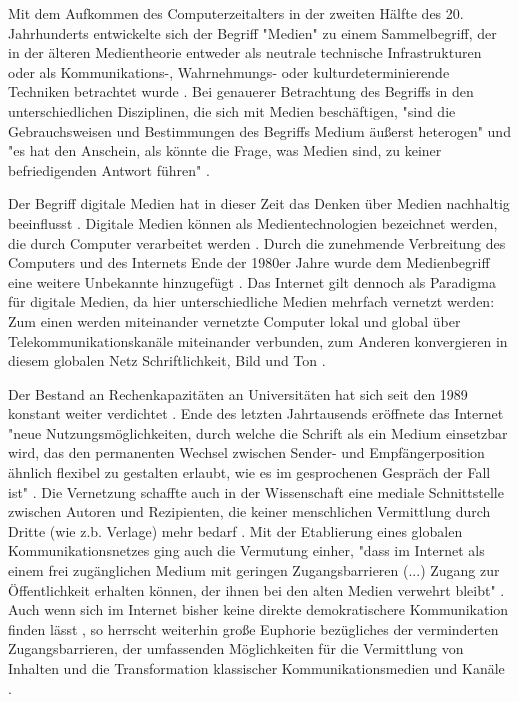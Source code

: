 Mit dem Aufkommen des Computerzeitalters in der zweiten Hälfte des 20. Jahrhunderts entwickelte sich der Begriff "Medien" zu einem Sammelbegriff, der in der älteren Medientheorie entweder als neutrale technische Infrastrukturen oder als Kommunikations-, Wahrnehmungs- oder kulturdeterminierende Techniken betrachtet wurde \cite{beck2005_Kommunikation}. Bei genauerer Betrachtung des Begriffs in den unterschiedlichen Disziplinen, die sich mit Medien beschäftigen, "sind die Gebrauchsweisen und Bestimmungen des Begriffs Medium äußerst heterogen" und "es hat den Anschein, als könnte die Frage, was Medien sind, zu keiner befriedigenden Antwort führen" \cite{Burkhardt_2015}.

Der Begriff digitale Medien hat in dieser Zeit das Denken über Medien nachhaltig beeinflusst  \cite{Burkhardt_2015}. Digitale Medien können als Medientechnologien bezeichnet werden, die durch Computer verarbeitet werden \cite{nunning_2013_metzler}. Durch die zunehmende Verbreitung des Computers und des Internets Ende der 1980er Jahre wurde dem Medienbegriff eine weitere Unbekannte hinzugefügt \cite{Burkhardt_2015}. Das Internet gilt dennoch als Paradigma für digitale Medien, da hier unterschiedliche Medien mehrfach vernetzt werden: Zum einen werden miteinander vernetzte Computer lokal und global über Telekommunikationskanäle miteinander verbunden, zum Anderen konvergieren in diesem globalen Netz Schriftlichkeit, Bild und Ton \cite{nunning_2013_metzler}.

Der Bestand an Rechenkapazitäten an Universitäten hat sich seit den 1989 konstant weiter verdichtet \cite{Rutenfranz_1997}. Ende des letzten Jahrtausends eröffnete das Internet "neue Nutzungsmöglichkeiten, durch welche die Schrift als ein Medium einsetzbar wird, das den permanenten Wechsel zwischen Sender- und Empfängerposition ähnlich flexibel zu gestalten erlaubt, wie es im gesprochenen Gespräch der Fall ist" \cite{sandbothe_2000_pragmatische}. Die Vernetzung schaffte auch in der Wissenschaft eine mediale Schnittstelle zwischen Autoren und Rezipienten, die keiner menschlichen Vermittlung durch Dritte (wie z.b. Verlage) mehr bedarf \cite{naeder_2010_open}. Mit der Etablierung eines globalen Kommunikationsnetzes ging auch die Vermutung einher, "dass im Internet als einem frei zugänglichen Medium mit geringen Zugangsbarrieren (...) Zugang zur Öffentlichkeit erhalten können, der ihnen bei den alten Medien verwehrt bleibt" \cite{Gerhards_2007}. Auch wenn sich im Internet bisher keine direkte demokratischere Kommunikation finden lässt \cite{Gerhards_2007}, so herrscht weiterhin große Euphorie bezügliches der verminderten Zugangsbarrieren, der umfassenden Möglichkeiten für die Vermittlung von Inhalten und die Transformation klassischer Kommunikationsmedien und Kanäle \cite{suchen}.

